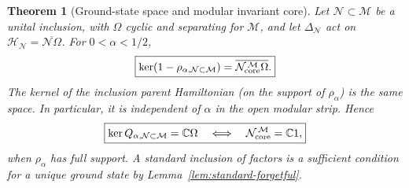 \documentclass[a4paper,11pt]{article}
\newtheorem{theorem}{Theorem}
\theoremstyle{definition}
\newcommand{\mN}{\mathcal{N}}
\newcommand{\mH}{\mathcal{H}}
\newcommand{\mM}{\mathcal{M}}
\begin{document}
\begin{theorem}[Ground-state space and modular invariant core]
\label{thm:Q-kernel-core}
Let $\mN\subset\mM$ be a unital inclusion, with $\Omega$
cyclic and separating for $\mM$, and let $\Delta_\mN$ act on
$\mH_\mN=\overline{\mN\Omega}$. For $0<\alpha<1/2$,
\begin{equation}
    \boxed{
    \ker(1-\rho_{\alpha,\mN\subset\mM})
    =\overline{\mN_{\rm core}^{\,\mM}\Omega}.}
    \label{eq:Q-kernel-core-theorem}
\end{equation}
The kernel of the inclusion parent Hamiltonian (on the support of
$\rho_\alpha$) is the same space. In particular, it is independent
of $\alpha$ in the open modular strip. Hence
\begin{equation}
    \boxed{\ker Q_{\alpha,\mN\subset\mM}=\mathbb C\Omega
    \quad\Longleftrightarrow\quad
    \mN_{\rm core}^{\,\mM}=\mathbb C1,}
    \label{eq:Q-core-unique-equivalence}
\end{equation}
when $\rho_\alpha$ has full support. A standard inclusion of factors
is a sufficient condition for a unique ground state by
Lemma~\ref{lem:standard-forgetful}.
\end{theorem}
\end{document}
